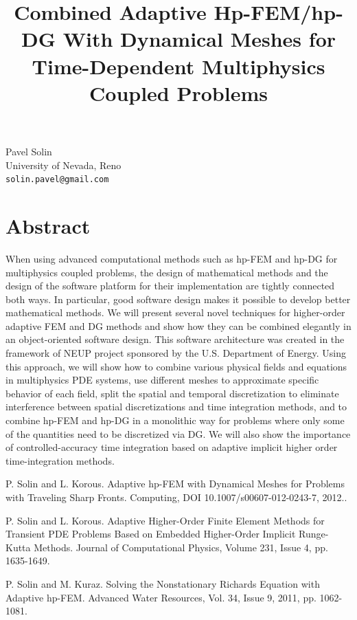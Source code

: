 \documentclass[article,A4,11pt]{llncs}%
\begin{document}
\title{Combined Adaptive Hp-FEM/hp-DG With Dynamical Meshes for Time-Dependent Multiphysics Coupled Problems}
 \author{} \institute{}
\maketitle
\begin{center}
{\large Pavel Solin}\\
University of Nevada, Reno\\
{\tt solin.pavel@gmail.com}
\end{center}

\section*{Abstract}
When using advanced computational methods such as hp-FEM and hp-DG for multiphysics coupled problems, the design of mathematical methods and the design of the software platform for their implementation are tightly connected both ways. In particular, good software design makes it possible to develop better mathematical methods. We will present several novel techniques for higher-order adaptive FEM and DG methods and show how they can be combined elegantly in an object-oriented software design. This software architecture was created in the framework of NEUP project sponsored by the U.S. Department of Energy. Using this approach, we will show how to combine various physical fields and equations in multiphysics PDE systems, use different meshes to approximate specific behavior of each field, split the spatial and temporal discretization to eliminate interference between spatial discretizations and time integration methods, and to combine hp-FEM and hp-DG in a monolithic way for problems where only some of the quantities need to be discretized via DG. We will also show the importance of controlled-accuracy time integration based on adaptive implicit higher order time-integration methods.


\begin{thebibliography}{10}
{\sc P. Solin and L. Korous}. {Adaptive hp-FEM with Dynamical Meshes for Problems with Traveling Sharp Fronts}. Computing, DOI 10.1007/s00607-012-0243-7, 2012..

{\sc P. Solin and L. Korous}. {Adaptive Higher-Order Finite Element Methods for Transient PDE Problems Based on Embedded Higher-Order Implicit Runge-Kutta Methods}. Journal of Computational Physics, Volume 231, Issue 4, pp. 1635-1649.

{\sc P. Solin and M. Kuraz}. {Solving the Nonstationary Richards Equation with Adaptive hp-FEM}. Advanced Water Resources, Vol. 34, Issue 9, 2011, pp. 1062-1081.
\end{thebibliography}
\end{document}
